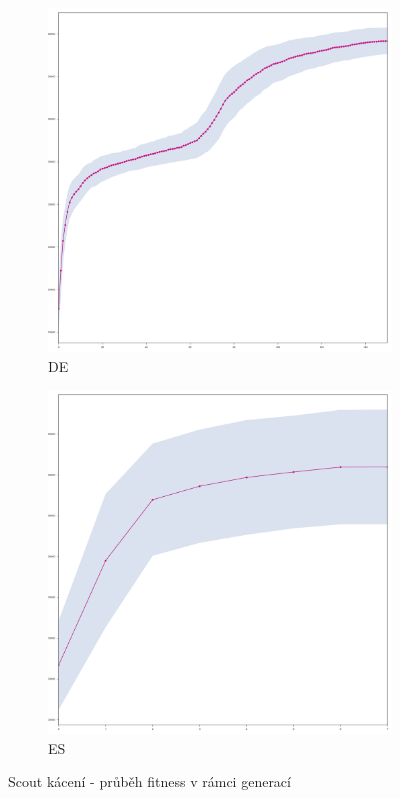 	\begin{figure}[p]
		\centering
		\begin{subfigure}{.5\textwidth}
			\centering
			\includegraphics[width=\linewidth]{../img/WoodMap/DE/graph_of_CuttorCut-mean.png}
			\caption{DE}
			\label{obr04:CutDE}
		\end{subfigure}%
		\begin{subfigure}{.5\textwidth}
			\centering
			\includegraphics[width=\linewidth]{../img/WoodMap/ES/WoodCutES-mean.png}
			\caption{ES}
			\label{obr04:CutES}
		\end{subfigure}
		\caption{Scout kácení - průběh fitness v rámci generací}
		\label{obr04:Cut}
	\end{figure}
	\clearpage
	
